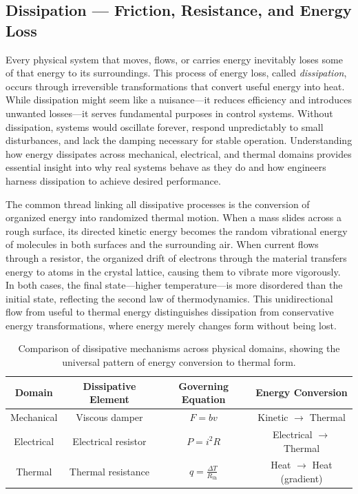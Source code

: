 \subsection{Dissipation — Friction, Resistance, and Energy Loss}

Every physical system that moves, flows, or carries energy inevitably loses some of that energy to its surroundings. This process of energy loss, called \emph{dissipation}, occurs through irreversible transformations that convert useful energy into heat. While dissipation might seem like a nuisance—it reduces efficiency and introduces unwanted losses—it serves fundamental purposes in control systems. Without dissipation, systems would oscillate forever, respond unpredictably to small disturbances, and lack the damping necessary for stable operation. Understanding how energy dissipates across mechanical, electrical, and thermal domains provides essential insight into why real systems behave as they do and how engineers harness dissipation to achieve desired performance.

The common thread linking all dissipative processes is the conversion of organized energy into randomized thermal motion. When a mass slides across a rough surface, its directed kinetic energy becomes the random vibrational energy of molecules in both surfaces and the surrounding air. When current flows through a resistor, the organized drift of electrons through the material transfers energy to atoms in the crystal lattice, causing them to vibrate more vigorously. In both cases, the final state—higher temperature—is more disordered than the initial state, reflecting the second law of thermodynamics. This unidirectional flow from useful to thermal energy distinguishes dissipation from conservative energy transformations, where energy merely changes form without being lost.

\begin{table}[h]
\centering
\begin{tabular}{|c|c|c|c|}
\hline
\textbf{Domain} & \textbf{Dissipative Element} & \textbf{Governing Equation} & \textbf{Energy Conversion} \\
\hline
Mechanical & Viscous damper & $F = b v$ & Kinetic $\rightarrow$ Thermal \\
\hline
Electrical & Electrical resistor & $P = i^2 R$ & Electrical $\rightarrow$ Thermal \\
\hline
Thermal & Thermal resistance & $q = \frac{\Delta T}{R_{\text{th}}}$ & Heat $\rightarrow$ Heat (gradient) \\
\hline
\end{tabular}
\caption{Comparison of dissipative mechanisms across physical domains, showing the universal pattern of energy conversion to thermal form.}
\end{table}

